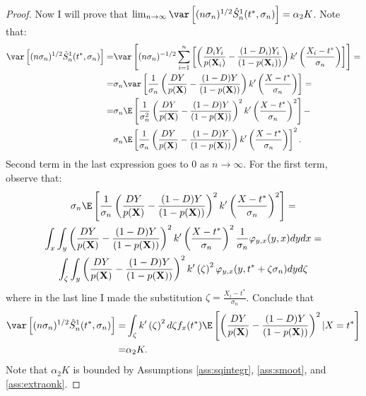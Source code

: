 {\begin{proof}
        Now I will prove that $\lim_{n\rightarrow \infty} \var \left[ (n\sigma_n)^{1/2} \hat{S}_n^1(t^*,\sigma_n) \right] = \alpha_2 K$. Note that:
        \begin{align}
            \var \left[ (n\sigma_n)^{1/2} \hat{S}_n^1(t^*,\sigma_n) \right] =& \var \left[ (n\sigma_n)^{-1/2} \sum_{i=1}^n \left[\left(\frac{D_i Y_i}{p(\textbf{X}_i)} - \frac{(1-D_i) Y_i}{(1-p(\textbf{X}_i))} \right) k'\left(\frac{X_i - t^*}{\sigma_n} \right) \right] \right] = \\
            =& \sigma_n \var \left[ \frac{1}{\sigma_n} \left(\frac{D Y}{p(\textbf{X})} - \frac{(1-D) Y}{(1-p(\textbf{X}))} \right) k'\left(\frac{X - t^*}{\sigma_n} \right) \right] = \\
            =& \sigma_n \E \left[ \frac{1}{\sigma_n^2} \left(\frac{D Y}{p(\textbf{X})} - \frac{(1-D) Y}{(1-p(\textbf{X}))} \right)^2 k'\left(\frac{X - t^*}{\sigma_n} \right)^2 \right] - \\
            & \sigma_n \E \left[ \frac{1}{\sigma_n} \left(\frac{D Y}{p(\textbf{X})} - \frac{(1-D) Y}{(1-p(\textbf{X}))} \right) k'\left(\frac{X - t^*}{\sigma_n} \right) \right]^2.
        \end{align}
        Second term in the last expression goes to 0 as $n \rightarrow \infty$. For the first term, observe that:
        \begin{gather}
            \sigma_n \E \left[ \frac{1}{\sigma_n} \left(\frac{D Y}{p(\textbf{X})} - \frac{(1-D) Y}{(1-p(\textbf{X}))} \right)^2 k'\left(\frac{X - t^*}{\sigma_n} \right)^2 \right] = \\
            \int_x \int_y \left(\frac{D Y}{p(\textbf{X})} - \frac{(1-D) Y}{(1-p(\textbf{X}))} \right)^2 k'\left(\frac{X - t^*}{\sigma_n} \right)^2 \frac{1}{\sigma_n} \varphi_{y,x}(y,x) d y d x = \\
            \int_\zeta \int_y \left(\frac{D Y}{p(\textbf{X})} - \frac{(1-D) Y}{(1-p(\textbf{X}))} \right)^2 k'\left(\zeta \right)^2 \varphi_{y,x}(y,t^* + \zeta \sigma_n) d y d \zeta
        \end{gather}
        where in the last line I made the substitution $\zeta = \frac{X_i - t^*}{\sigma_n}$. Conclude that
        \begin{align}
            \var \left[ (n\sigma_n)^{1/2} \hat{S}_n^1(t^*,\sigma_n) \right] =& \int_\zeta k'\left(\zeta \right)^2 d \zeta f_x(t^*) \E \left [ \left(\frac{D Y}{p(\textbf{X})} - \frac{(1-D) Y}{(1-p(\textbf{X}))} \right)^2 | X 
            = t^* \right] \\ =& \alpha_2 K.
        \end{align}
        Note that $\alpha_2 K$ is bounded by Assumptions \ref{ass:sqintegr}, \ref{ass:smoot}, and \ref{ass:extraonk}.
    \end{proof}

}
